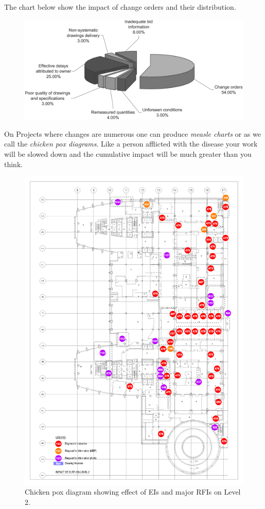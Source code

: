 The chart below show the impact of change orders and their distribution. 

\begin{figure}
\includegraphics[width=1.3\textwidth]{./graphics/change-orders}
\end{figure}

On Projects where changes are numerous one can produce \textit{measle charts} or
as we call the \textit{chicken pox diagrams}. Like a person afflicted with the
disease your work will be slowed down and the cumulative impact will be much
greater than you think.


\begin{fullwidth}
\begin{figure}
\includegraphics[width=1.1\textwidth]{./graphics/AHU/cpL2}
\caption{Chicken pox diagram showing effect of EIs and major RFIs on Level 2.}
\end{figure}
\end{fullwidth}

